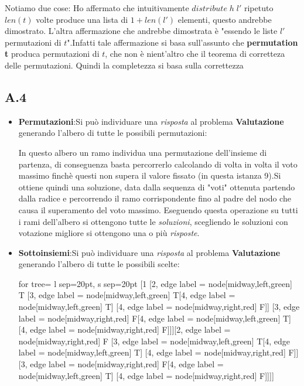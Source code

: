 \documentclass[a4paper]{article}
\begin{document}
Notiamo due cose:
Ho affermato che intuitivamente $distribute \; h \; l'$ ripetuto $len(t)$ volte produce una lista di $ 1 + len(l')$ elementi, questo andrebbe dimostrato.
L'altra affermazione che andrebbe dimostrata è "essendo le liste $l'$ permutazioni di $t$".Infatti tale affermazione si basa sull'assunto che \textbf{permutation t} produca permutazioni di $t$, che non è nient'altro che il teorema di corretteza delle permutazioni.
Quindi la completezza si basa sulla correttezza
\subsection{A.4}
\begin{itemize}
	\item \textbf{Permutazioni}:Si può individuare una \emph{risposta} al problema \textbf{Valutazione} generando l'albero di tutte le possibili permutazioni:
		\begin{center}	
		\end{center}
		In questo albero un ramo individua una permutazione dell'insieme di partenza, di conseguenza basta percorrerlo calcolando di volta in volta il voto massimo finchè questi non supera il valore fissato (in questa istanza 9).Si ottiene quindi una soluzione, data dalla sequenza di "voti" ottenuta partendo dalla radice e percorrendo il ramo corrispondente fino al padre del nodo che causa il superamento del voto massimo.
		Eseguendo questa operazione su tutti i rami dell'albero si ottengono tutte le \emph{soluzioni}, scegliendo le soluzioni con votazione migliore si ottengono una o più \emph{risposte}.
	\item \textbf{Sottoinsiemi}:Si può individuare una \emph{risposta} al problema \textbf{Valutazione} generando l'albero di tutte le possibili scelte:
		\begin{center}
			\begin{forest}
				for tree={ l sep=20pt, s sep=20pt}
			[1 [2, edge label = {node[midway,left,green] {T}} [3, edge label = {node[midway,left,green] {T}}[4, edge label = {node[midway,left,green] {T}}] [4, edge label = {node[midway,right,red] {F}}]] [3, edge label = {node[midway,right,red] {F}}[4, edge label = {node[midway,left,green] {T}}] [4, edge label = {node[midway,right,red] {F}}]]][2, edge label = {node[midway,right,red] {F}} [3, edge label = {node[midway,left,green] {T}}[4, edge label = {node[midway,left,green] {T}}] [4, edge label = {node[midway,right,red] {F}}]] [3, edge label = {node[midway,right,red] {F}}[4, edge label = {node[midway,left,green] {T}}] [4, edge label = {node[midway,right,red] {F}}]]]] 			\end{forest}

\end{center}
\end{itemize}
\end{document}

